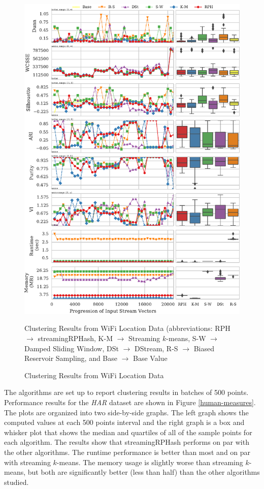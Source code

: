 \begin{figure}
  \centerline{\includegraphics[width=.9\textwidth]{figs/ujii_all_measures}}
  \caption{Clustering Results from WiFi Location Data}{Clustering Results from WiFi Location Data (abbreviations:
    RPH $\rightarrow$ \textsf{streamingRPHash},
    K-M $\rightarrow$ Streaming $k$-means,
    S-W $\rightarrow$ Damped Sliding Window,
    DSt $\rightarrow$ DStream,
    R-S $\rightarrow$ Biased Reservoir Sampling, and
    Base $\rightarrow$ Base Value}\label{indoor-measures}
\end{figure}

The algorithms are set up to report clustering results in batches of 500 points.  Performance
results for the \emph{HAR} dataset are shown in Figure \ref{human-measures}.  The plots are
organized into two side-by-side graphs.  The left graph shows the computed values at each 500 points
interval and the right graph is a box and whisker plot that shows the median and quartiles of all of
the sample points for each algorithm.  The results show that \textsf{streamingRPHash} performs on
par with the other algorithms.  The runtime performance is better than most and on par with
streaming $k$-means.  The memory usage is slightly worse than streaming $k$-means, but both are
significantly better (less than half) than the other algorithms studied.

